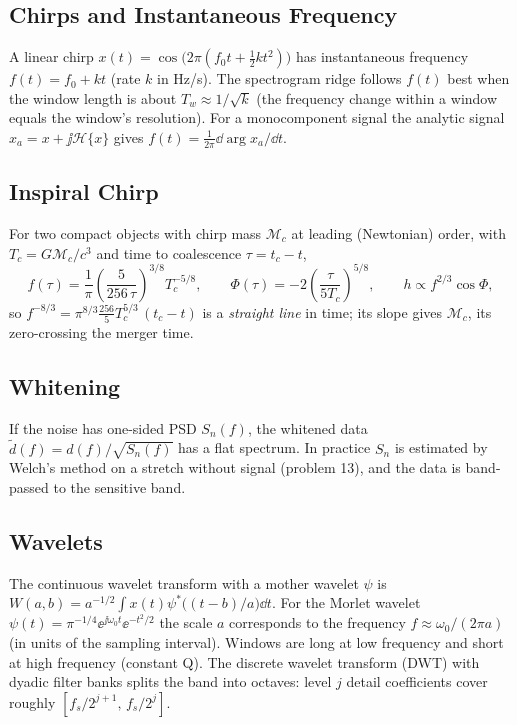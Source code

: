 \documentclass[11pt,a4paper]{article}
\begin{document}
\subsection{Chirps and Instantaneous Frequency}
A linear chirp $x(t)=\cos\big(2\pi(f_0t+\tfrac12kt^2)\big)$ has instantaneous frequency $f(t)=f_0+kt$ (rate $k$ in Hz/s). The spectrogram ridge follows $f(t)$ best when the window length is about $T_w\approx1/\sqrt k$ (the frequency change within a window equals the window's resolution). For a monocomponent signal the analytic signal $x_a=x+\jj\mathcal H\{x\}$ gives $f(t)=\frac1{2\pi}\dd\arg x_a/\dd t$.

\subsection{Inspiral Chirp}
For two compact objects with chirp mass $\mathcal M_c$ at leading (Newtonian) order, with $T_c=G\mathcal M_c/c^3$ and time to coalescence $\tau=t_c-t$,
\begin{equation}
  f(\tau)=\frac1\pi\left(\frac5{256\,\tau}\right)^{3/8}T_c^{-5/8},\qquad
  \Phi(\tau)=-2\left(\frac{\tau}{5T_c}\right)^{5/8},\qquad h\propto f^{2/3}\cos\Phi,
  \label{eq:chirp}
\end{equation}
so $f^{-8/3}=\pi^{8/3}\frac{256}{5}T_c^{5/3}\,(t_c-t)$ is a \emph{straight line} in time; its slope gives $\mathcal M_c$, its zero-crossing the merger time.

\subsection{Whitening}
If the noise has one-sided PSD $S_n(f)$, the whitened data $\tilde d(f)=d(f)/\sqrt{S_n(f)}$ has a flat spectrum. In practice $S_n$ is estimated by Welch's method on a stretch without signal (problem 13), and the data is band-passed to the sensitive band.

\subsection{Wavelets}
The continuous wavelet transform with a mother wavelet $\psi$ is $W(a,b)=a^{-1/2}\int x(t)\psi^\ast\!\big((t-b)/a\big)\dd t$. For the Morlet wavelet $\psi(t)=\pi^{-1/4}\ee^{\jj\omega_0t}\ee^{-t^2/2}$ the scale $a$ corresponds to the frequency $f\approx\omega_0/(2\pi a)$ (in units of the sampling interval). Windows are long at low frequency and short at high frequency (constant Q). The discrete wavelet transform (DWT) with dyadic filter banks splits the band into octaves: level $j$ detail coefficients cover roughly $[f_s/2^{j+1},\,f_s/2^{j}]$.
\end{document}
